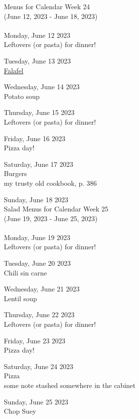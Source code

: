 \documentclass[12pt, parskip=full*]{scrreprt}
\begin{document}
\begin{center}
{\Large Menus for Calendar Week 24} \\ 
{\small (June 12, 2023 - June 18, 2023)}\\ 
 ~ \\{\calligra \Large Monday, June 12 2023} \\ 
Leftovers (or pasta) for dinner!

{\calligra \Large Tuesday, June 13 2023} \\ 
\href{https://example.com/falafel}{Falafel}

{\calligra \Large Wednesday, June 14 2023} \\ 
Potato soup

{\calligra \Large Thursday, June 15 2023} \\ 
Leftovers (or pasta) for dinner!

{\calligra \Large Friday, June 16 2023} \\ 
Pizza day!

{\calligra \Large Saturday, June 17 2023} \\ 
Burgers\\
{\small my trusty old cookbook, p. 386}

{\calligra \Large Sunday, June 18 2023} \\ 
Salad
\newpage
{\Large Menus for Calendar Week 25} \\ 
{\small (June 19, 2023 - June 25, 2023)}\\ 
 ~ \\{\calligra \Large Monday, June 19 2023} \\ 
Leftovers (or pasta) for dinner!

{\calligra \Large Tuesday, June 20 2023} \\ 
Chili sin carne

{\calligra \Large Wednesday, June 21 2023} \\ 
Lentil soup

{\calligra \Large Thursday, June 22 2023} \\ 
Leftovers (or pasta) for dinner!

{\calligra \Large Friday, June 23 2023} \\ 
Pizza day!

{\calligra \Large Saturday, June 24 2023} \\ 
Pizza\\
{\small some note stashed somewhere in the cabinet}

{\calligra \Large Sunday, June 25 2023} \\ 
Chop Suey
\end{center}
\end{document}
